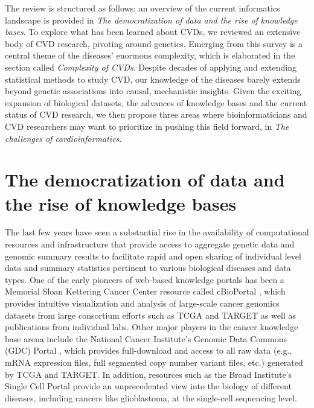 \documentclass[letter]{bib}
\begin{document}
The review is structured as follows: an overview of the current informatics landscape is provided in \textit{The democratization of data and the rise of knowledge bases}. To explore what has been learned about CVDs, we reviewed an extensive body of CVD research, pivoting around genetics. Emerging from this survey is a central theme of the diseases' enormous complexity, which is elaborated in the section called \textit{Complexity of CVDs}.
Despite decades of applying and extending statistical methods to study CVD, our knowledge of the diseases barely extends beyond genetic associations into causal, mechanistic insights. 
Given the exciting expansion of biological datasets, the advances of knowledge bases and the current status of CVD research, we then propose three areas where bioinformaticians and CVD researchers may want to prioritize in pushing this field forward, in \textit{The challenges of cardioinformatics}.

\section*{The democratization of data and the rise of knowledge bases}

The last few years have seen a substantial rise in the availability of computational resources and infrastructure that provide access to aggregate genetic data and genomic summary results to facilitate rapid and open sharing of individual level data and summary statistics pertinent to various biological diseases and data types.  One of the early pioneers of web-based knowledge portals has been a Memorial Sloan Kettering Cancer Center resource called cBioPortal \citep{Cerami:2012:cBio,Gao:2013:Integrative}, which provides intuitive visualization and analysis of large-scale cancer genomics datasets from large consortium efforts such as TCGA \citep{TCGA:2013:Cancer} and TARGET \citep{Koscielny:2017:Open} as well as publications from individual labs.  Other major players in the cancer knowledge base arena include the National Cancer Institute's Genomic Data Commons (GDC) Portal \citep{Grossman:2016:Shared,Jensen:2017:NCI}, which provides full-download and access to all raw data (e.g., mRNA expression files, full segmented copy number variant files, etc.) generated by TCGA and TARGET.  In addition, resources such as the Broad Institute's Single Cell Portal \citep{Broad:2018:Single} provide an unprecedented view into the biology of different diseases, including cancers like glioblastoma, at the single-cell sequencing level.    
	
\end{document}
